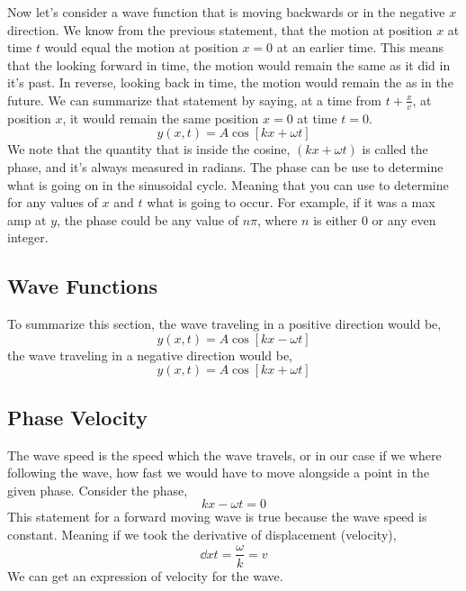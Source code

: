 Now let's consider a wave function that is moving backwards or in the negative $x$ direction. We know from the previous statement, that the motion at position $x$ at time $t$ would equal the motion at position $x=0$ at an earlier time. This means that the looking forward in time, the motion would remain the same as it did in it's past. In reverse, looking back in time, the motion would remain the as in the future. We can summarize that statement by saying, at a time from $t + \frac{x}{v}$, at position $x$, it would remain the same position $x=0$ at time $t=0$. 
\begin{equation*}
	y(x,t) = A\cos[kx + \omega t]
\end{equation*}
We note that the quantity that is inside the cosine, $(kx + \omega t)$ is called the phase, and it's always measured in radians. The phase can be use to determine what is going on in the sinusoidal cycle. Meaning that you can use to determine for any values of $x$ and $t$ what is going to occur. For example, if it was a max amp at $y$, the phase could be any value of $n\pi$, where $n$ is either $0$ or any even integer.  


\subsection{Wave Functions}
To summarize this section, the wave traveling in a positive direction would be, 
\begin{equation*}
	y(x,t) = A\cos[kx - \omega t] 
\end{equation*}
the wave traveling in a negative direction would be, 
\begin{equation*}
	y(x,t) = A\cos[kx + \omega t]
\end{equation*}


\subsection{Phase Velocity}
The wave speed is the speed which the wave travels, or in our case if we where following the wave, how fast we would have to move alongside a point in the given phase. Consider the phase, 
\begin{equation*}
	kx - \omega t = 0 
\end{equation*}
This statement for a forward moving wave is true because the wave speed is constant. Meaning if we took the derivative of displacement (velocity), 
\begin{equation*}
	\dd{x}{t} = \frac{\omega}{k} = v
\end{equation*}
We can get an expression of velocity for the wave.	

